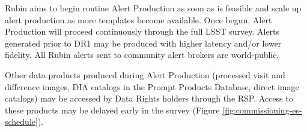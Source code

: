 Rubin aims to begin routine Alert Production as soon as is feasible and scale up alert production as more templates become available.
Once begun, Alert Production will proceed continuously through the full LSST survey.
Alerts generated prior to DR1 may be produced with higher latency and/or lower fidelity.
All Rubin alerts sent to community alert brokers are world-public.

Other data products produced during Alert Production (processed visit and difference images, DIA catalogs in the Prompt Products Database, direct image catalogs) may be accessed by Data Rights holders through the RSP.
Access to these products may be delayed early in the survey (Figure \ref{fig:commissioning-es-schedule}).
